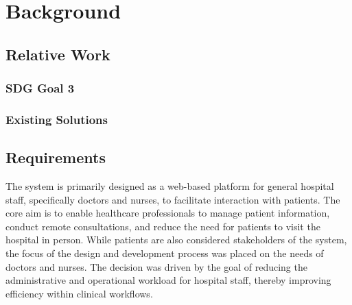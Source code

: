 %
%
\chapter{Background}
\label{chap:background}


\section{Relative Work}
\label{sec:relative-work}

\subsection{SDG Goal 3}
\label{sec:sdg-goal-3}


\subsection{Existing Solutions}
\label{sec:existing-solutions}


\section{Requirements}
\label{sec:requirements}

The system is primarily designed as a web-based platform for general hospital staff, specifically doctors and nurses, to facilitate interaction with patients. The core aim is to enable healthcare professionals to manage patient information, conduct remote consultations, and reduce the need for patients to visit the hospital in person.
While patients are also considered stakeholders of the system, the focus of the design and development process was placed on the needs of doctors and nurses. The decision was driven by the goal of reducing the administrative and operational workload for hospital staff, thereby improving efficiency within clinical workflows.

